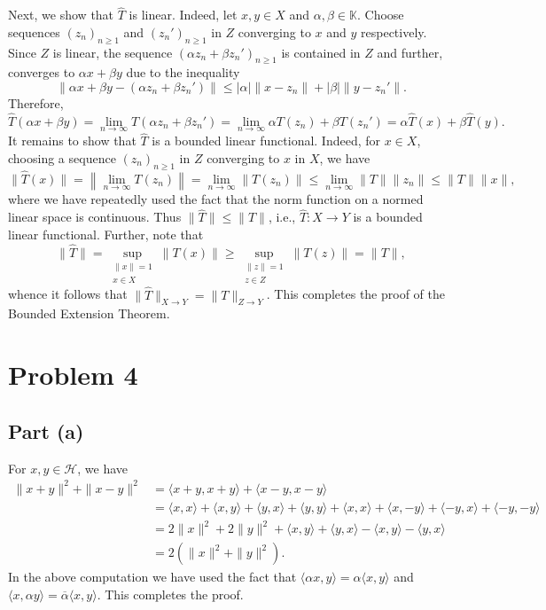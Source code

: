 \documentclass[11pt]{article}
\theoremstyle{thmstyle}
\theoremstyle{defstyle}
\newcommand{\R}{\mathbb{R}}
\newcommand{\bbC}{\mathbb{C}}
\newcommand{\K}{\mathbb{K}} %
\newcommand{\wh}[1]{\widehat{#1}}
\renewcommand{\le}{\leqslant}
\renewcommand{\ge}{\geqslant}
\newcommand{\calH}{\mathcal{H}}
\begin{document}
Next, we show that $\wh T$ is linear. Indeed, let $x, y\in X$ and $\alpha, \beta\in\K$. Choose sequences $(z_n)_{n\ge 1}$ and $(z_n')_{n\ge 1}$ in $Z$ converging to $x$ and $y$ respectively. Since $Z$ is linear, the sequence $(\alpha z_n + \beta z_n')_{n\ge 1}$ is contained in $Z$ and further, converges to $\alpha x + \beta y$ due to the inequality 
\begin{equation*}
    \|\alpha x + \beta y -(\alpha z_n + \beta z_n')\|\le |\alpha|\|x - z_n\| + |\beta|\|y - z_n'\|.
\end{equation*}
Therefore, 
\begin{equation*}
    \wh T(\alpha x + \beta y) = \lim_{n\to\infty} T\left(\alpha z_n + \beta z_n'\right) = \lim_{n\to\infty}\alpha T(z_n) + \beta T(z_n') = \alpha\wh T(x) + \beta\wh T(y).
\end{equation*}
It remains to show that $\wh T$ is a bounded linear functional. Indeed, for $x\in X$, choosing a sequence $(z_n)_{n\ge 1}$ in $Z$ converging to $x$ in $X$, we have 
\begin{equation*}
    \|\wh T(x)\| = \left\|\lim_{n\to\infty} T(z_n)\right\| = \lim_{n\to\infty}\|T(z_n)\|\le\lim_{n\to\infty}\|T\|\|z_n\|\le \|T\|\|x\|,
\end{equation*}
where we have repeatedly used the fact that the norm function on a normed linear space is continuous. Thus $\|\wh T\|\le \|T\|$, i.e., $\wh T\colon X\to Y$ is a bounded linear functional. Further, note that 
\begin{equation*}
    \|\wh T\| = \sup_{\substack{\|x\| = 1\\ x\in X}}\|T(x)\|\ge\sup_{\substack{\|z\| = 1\\ z\in Z}}\|T(z)\| = \|T\|,
\end{equation*}
whence it follows that $\|\wh T\|_{X\to Y} = \|T\|_{Z\to Y}$. This completes the proof of the Bounded Extension Theorem.

\section{Problem 4}

\subsection{Part (a)}

For $x, y\in\calH$, we have
\begin{align*}
    \|x + y\|^2 + \|x - y\|^2 &= \langle x + y, x + y\rangle + \langle x - y, x - y\rangle\\
    &= \langle x, x\rangle + \langle x, y\rangle + \langle y, x\rangle + \langle y, y\rangle + \langle x, x\rangle + \langle x, -y\rangle + \langle -y, x\rangle + \langle -y, -y\rangle\\
    &= 2\|x\|^2 + 2\|y\|^2 + \langle x, y\rangle + \langle y, x\rangle - \langle x, y\rangle - \langle y, x\rangle\\
    &= 2\left(\|x\|^2 + \|y\|^2\right).
\end{align*}
In the above computation we have used the fact that $\langle\alpha x, y\rangle = \alpha\langle x, y\rangle$ and $\langle x, \alpha y\rangle = \overline\alpha\langle x, y\rangle$. This completes the proof.
\end{document}
